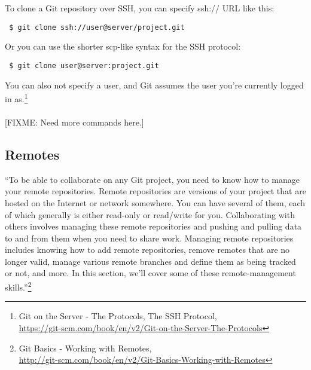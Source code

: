 \documentclass[12pt,letterpaper,dvips]{article}
\newcommand{\FIXME}[1]{\textsf{[FIXME: #1]}}
\begin{document}
\newpage
\noindent To clone a Git repository over SSH, you can specify ssh:// URL like this:\\
\begin{Verbatim}
 $ git clone ssh://user@server/project.git
\end{Verbatim}

\noindent Or you can use the shorter scp-like syntax for the SSH protocol:

\begin{Verbatim}
 $ git clone user@server:project.git
\end{Verbatim}

\noindent You can also not specify a user, and Git assumes the user
you're currently logged in as.\footnote{
Git on the Server - The Protocols, The SSH Protocol,\\
\href{https://git-scm.com/book/en/v2/Git-on-the-Server-The-Protocols}{https://git-scm.com/book/en/v2/Git-on-the-Server-The-Protocols}}
\\
\\
\noindent \FIXME{Need more commands here.}


\newpage
\subsection{Remotes}
``To be able to collaborate on any Git project, you need to know
how to manage your remote repositories.  Remote repositories are
versions of your project that are hosted on the Internet or
network somewhere.  You can have several of them, each of which
generally is either read-only or read/write for you.
Collaborating with others involves managing these remote
repositories and pushing and pulling data to and from them when
you need to share work.  Managing remote repositories includes
knowing how to add remote repositories, remove remotes that are no
longer valid, manage various remote branches and define them as
being tracked or not, and more. In this section, we’ll cover some
of these remote-management skills.''\footnote{Git Basics - Working
with Remotes,\\
\href{http://git-scm.com/book/en/v2/Git-Basics-Working-with-Remotes}{http://git-scm.com/book/en/v2/Git-Basics-Working-with-Remotes}}


\end{document}
